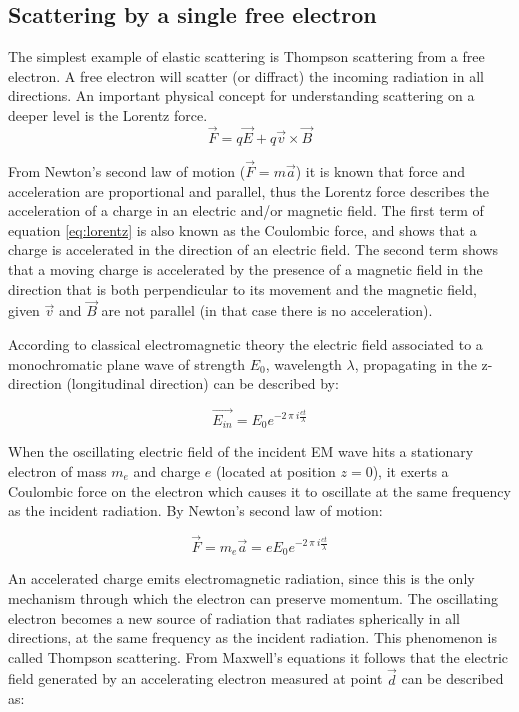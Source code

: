 \subsection{Scattering by a single free electron}
The simplest example of elastic scattering is Thompson scattering from a free electron. A free electron will scatter (or diffract) the incoming radiation in all directions. An important physical concept for understanding scattering on a deeper level is the Lorentz force. 
\begin{equation}\label{eq:lorentz}
\vec{F} = q\vec{E} + q\vec{v}\times\vec{B}
\end{equation} 

From Newton's second law of motion ($\vec{F} = m \vec{a}$) it is known that force and acceleration are
proportional and parallel, thus the Lorentz force describes the acceleration of a charge in an electric and/or magnetic field. The first term of equation \ref{eq:lorentz} is also known as the Coulombic force, and shows that a charge is accelerated in the direction of an electric field. The second term shows that a moving charge is accelerated by the presence of a magnetic field in the direction that is both perpendicular to its movement and the magnetic field, given $\vec{v}$ and $\vec{B}$ are not parallel (in
that case there is no acceleration).

According to classical electromagnetic theory the electric field associated to a monochromatic plane wave of strength $E_0$, wavelength $\lambda$, propagating in the z-direction (longitudinal direction) can be described by: 

\begin{equation}\label{eq:plane_wave}
\vec{E_{in}} = E_0 e^{-2\,\pi\ i \frac{ c t }{\lambda}}
\end{equation} 

When the oscillating electric field of the incident EM wave hits a stationary electron of mass $m_e$ and charge $e$ (located at position $z = 0$), it exerts a Coulombic force on the electron which causes it to oscillate at the same frequency as the incident radiation. By Newton's second law of motion:

\begin{equation}\label{eq:motion_single}
\vec{F} = m_e \vec{a} = e E_0 e^{-2\,\pi\ i \frac{ c t}{\lambda}} 
\end{equation}

An accelerated charge emits electromagnetic radiation, since this is the only mechanism through which the electron can preserve momentum. The oscillating electron becomes a new source of radiation that radiates spherically in all directions, at the same frequency as the incident radiation. This phenomenon is called Thompson scattering. From Maxwell's equations it follows that the electric field generated by an accelerating electron measured at point $\vec{d}$  can be described as:

